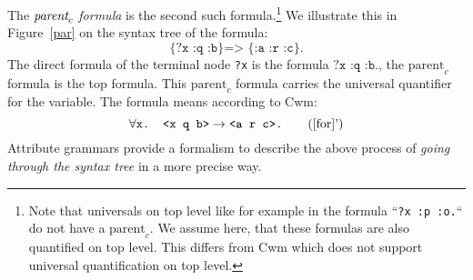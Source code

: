 The $\emph{parent}_c$ \emph{formula} is the second such formula.\footnote{Note that universals on top level like for example in the formula ``\texttt{?x :p :o.}`` 
do not have a $\text{parent}_c$. 
We assume here, that these formulas are also quantified on top level. This differs from Cwm which does not support universal quantification on top level.}
%
%
%
We illustrate this in Figure~\ref{par} on the syntax tree of the formula:
\begin{equation}
 \texttt{\{?x :q :b\} => \{:a :r :c\}.}\label{for}
\end{equation}
The direct formula of the terminal node \texttt{?x} is the formula $\texttt{?x :q :b.}$, the
$\text{parent}_c$ formula is the 
top formula. This $\text{parent}_c$ formula carries the universal quantifier for the variable.
 The formula means according to Cwm:
\begin{equation}
\forall \texttt{x. <x q b>}\rightarrow  \texttt{<a r c>.}
 \tag{\ref{for}'}
\end{equation}
Attribute grammars provide a formalism to describe the above process of \emph{going through the syntax tree} in a more precise way. 



